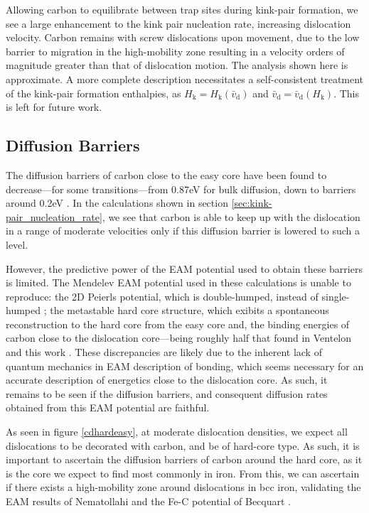 \documentclass[a4paper,11pt]{article}
\begin{document}
Allowing carbon to equilibrate between trap sites during kink-pair formation, we see a
large enhancement to the kink pair nucleation rate, increasing dislocation
velocity. Carbon remains with screw dislocations upon movement, due to the low barrier
to migration in the high-mobility zone resulting in a velocity orders of magnitude
greater than that of dislocation motion. The analysis shown here is approximate. A
more complete description necessitates a self-consistent treatment of the kink-pair
formation enthalpies, as \(H_{\text{k}} = H_{\text{k}}(\bar{v}_{\text{d}})\) and
\(\bar{v}_{\text{d}} = \bar{v}_{\text{d}}(H_{\text{k}})\). This is left for future work.




\subsection{Diffusion Barriers}
\label{sec:orge43f177}

The diffusion barriers of carbon close to the easy core have been found to decrease---for some
transitions---from 0.87eV for bulk diffusion, down to barriers around 0.2eV
\cite{Nematollahi2016}. In the calculations shown in section \ref{sec:kink-pair_nucleation_rate}, we
see that carbon is able to keep up with the dislocation in a range of moderate velocities only if this
diffusion barrier is lowered to such a level.

However, the predictive power of the EAM potential used to obtain these barriers is limited. The
Mendelev EAM potential used in these calculations is unable to reproduce: the 2D Peierls
potential, which is double-humped, instead of single-humped \cite{Mendelev2003}; the metastable
hard core structure, which exibits a spontaneous reconstruction to the hard core from the easy core and, the binding energies of
carbon close to the dislocation core---being roughly half that found in Ventelon and this work
\cite{Becquart2007,Ventelon2015}. These discrepancies are likely due to the inherent lack of
quantum mechanics in EAM description of bonding, which seems necessary for an accurate
description of energetics close to the dislocation core. As such, it remains to be seen if the
diffusion barriers, and consequent diffusion rates obtained from this EAM potential are faithful.

As seen in figure \ref{cdhardeasy}, at moderate dislocation densities, we expect all dislocations
to be decorated with carbon, and be of hard-core type. As such, it is important to ascertain the
diffusion barriers of carbon around the hard core, as it is the core we expect to find most
commonly in iron. From this, we can ascertain if there exists a high-mobility zone around
dislocations in bcc iron, validating the EAM results of Nematollahi and the Fe-C potential of Becquart \cite{Nematollahi2016,Becquart2007}.
\end{document}
